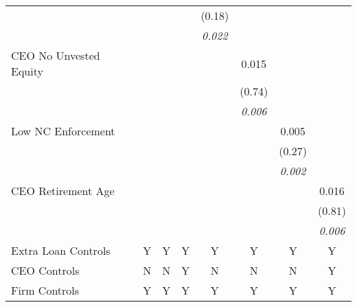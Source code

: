 {\begin{tabular}{l*{7}{c}}
                &                  &                  &                  &   (0.18)         &                  &                  &                  \\
                &                  &                  &                  &\textit{0.022}         &                  &                  &                  \\
CEO No Unvested Equity&                  &                  &                  &                  &    0.015         &                  &                  \\
                &                  &                  &                  &                  &   (0.74)         &                  &                  \\
                &                  &                  &                  &                  &\textit{0.006}         &                  &                  \\
Low NC Enforcement&                  &                  &                  &                  &                  &    0.005         &                  \\
                &                  &                  &                  &                  &                  &   (0.27)         &                  \\
                &                  &                  &                  &                  &                  &\textit{0.002}         &                  \\
CEO Retirement Age&                  &                  &                  &                  &                  &                  &    0.016         \\
                &                  &                  &                  &                  &                  &                  &   (0.81)         \\
                &                  &                  &                  &                  &                  &                  &\textit{0.006}         \\
\addlinespace Extra Loan Controls&        Y         &        Y         &        Y         &        Y         &        Y         &        Y         &        Y         \\
\addlinespace \midrule CEO Controls    &        N         &        N         &        Y         &        N         &        N         &        N         &        Y         \\
Firm Controls   &        Y         &        Y         &        Y         &        Y         &        Y         &        Y         &        Y         \\

\end{tabular}}
